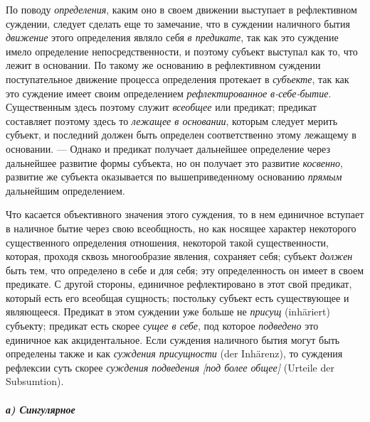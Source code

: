 \documentclass[twoside]{article}
\begin{document}
{{{По поводу
{\em определения}, каким
оно в своем движении выступает в рефлективном суждении, следует сделать еще
то замечание, что в суждении наличного бытия
{\em движение} этого
определения являло себя {\em в
предикате}, так как это суждение имело определение
непосредственности, и поэтому субъект выступал как то, что лежит в
основании. По такому же основанию в рефлективном суждении
поступательное движение процесса определения протекает в
{\em субъекте}, так как
это суждение имеет своим определением
{\em рефлектированное в-себе-бытие}.
Существенным здесь поэтому служит
{\em всеобщее} или
предикат; предикат составляет поэтому здесь то
{\em лежащее в основании},
которым следует мерить субъект, и последний должен быть
определен соответственно этому лежащему в основании. —
Однако и предикат получает дальнейшее определение через
дальнейшее развитие формы субъекта, но он получает это развитие
{\em косвенно}, развитие
же субъекта оказывается по вышеприведенному основанию
{\em прямым} дальнейшим
определением.

Что касается объективного значения этого суждения, то в нем
единичное вступает в наличное бытие через свою всеобщность, но как носящее
характер некоторого существенного определения отношения, некоторой такой
существенности, которая, проходя сквозь многообразие явления, сохраняет
себя; субъект {\em должен}
быть тем, что определено в себе и для себя; эту
определенность он имеет в своем предикате. С другой стороны, единичное
рефлектировано в этот свой предикат, который есть его всеобщая сущность;
постольку субъект есть существующее и являющееся. Предикат в этом суждении
уже больше не {\em присущ} (inhäriert)
субъекту; предикат есть скорее
{\em сущее в себе}, под
которое {\em подведено}
это единичное как акцидентальное. Если суждения наличного
бытия могут быть определены также и как
{\em суждения присущности} (der
Inhärenz), то суждения рефлексии суть скорее
{\em суждения подведения [под более
общее]} (Urteile der Subsumtion).

\subparagraph[а) Сингулярное суждение]{а) Сингулярное}}}}
\end{document}
